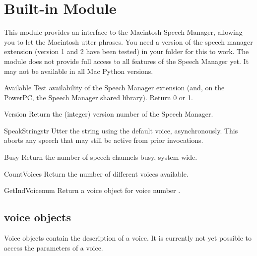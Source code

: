 \section{Built-in Module }
\label{module-macspeech}


This module provides an interface to the Macintosh Speech Manager,
allowing you to let the Macintosh utter phrases. You need a version of
the speech manager extension (version 1 and 2 have been tested) in
your  folder for this to work. The module does not
provide full access to all features of the Speech Manager yet.  It may
not be available in all Mac Python versions.

\begin{funcdesc}{Available}{}
Test availability of the Speech Manager extension (and, on the
PowerPC, the Speech Manager shared library). Return 0 or 1. 
\end{funcdesc}

\begin{funcdesc}{Version}{}
Return the (integer) version number of the Speech Manager.
\end{funcdesc}

\begin{funcdesc}{SpeakString}{str}
Utter the string  using the default voice,
asynchronously. This aborts any speech that may still be active from
prior  invocations.
\end{funcdesc}

\begin{funcdesc}{Busy}{}
Return the number of speech channels busy, system-wide.
\end{funcdesc}

\begin{funcdesc}{CountVoices}{}
Return the number of different voices available.
\end{funcdesc}

\begin{funcdesc}{GetIndVoice}{num}
Return a voice object for voice number .
\end{funcdesc}

\subsection{voice objects}
Voice objects contain the description of a voice. It is currently not
yet possible to access the parameters of a voice.

